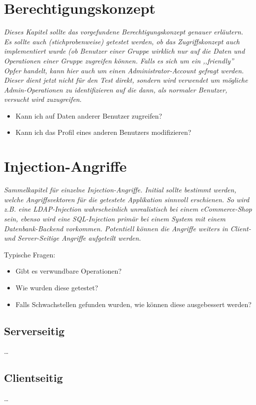 \documentclass[12pt,a4paper]{report}
\begin{document}
\section{Berechtigungskonzept}

\textit{Dieses Kapitel sollte das vorgefundene Berechtigungskonzept genauer erläutern. Es sollte auch (stichprobenweise) getestet werden, ob das Zugriffskonzept auch implementiert wurde (ob Benutzer einer Gruppe wirklich nur auf die Daten und Operationen einer Gruppe zugreifen können. Falls es sich um ein ,,friendly'' Opfer handelt, kann hier auch um einen Administrator-Account gefragt werden. Dieser dient jetzt nicht für den Test direkt, sondern wird verwendet um mögliche Admin-Operationen zu identifizieren auf die dann, als normaler Benutzer, versucht wird zuzugreifen}.

\begin{itemize}
				\item Kann ich auf Daten anderer Benutzer zugreifen?
				\item Kann ich das Profil eines anderen Benutzers modifizieren?
\end{itemize}

\section{Injection-Angriffe}

\textit{Sammelkapitel für einzelne Injection-Angriffe. Initial sollte bestimmt werden, welche Angriffsvektoren für die getestete Applikation sinnvoll erschienen. So wird z.B. eine LDAP-Injection wahrscheinlich unrealistisch bei einem eCommerce-Shop sein, ebenso wird eine SQL-Injection primär bei einem System mit einem Datenbank-Backend vorkommen. Potentiell können die Angriffe weiters in Client- und Server-Seitige Angriffe aufgeteilt werden.}

Typische Fragen:

\begin{itemize}
	\item Gibt es verwundbare Operationen?
	\item Wie wurden diese getestet?
	\item Falls Schwachstellen gefunden wurden, wie können diese ausgebessert werden?
\end{itemize}

\subsection{Serverseitig}

\ldots

\subsection{Clientseitig}

\ldots
\end{document}
